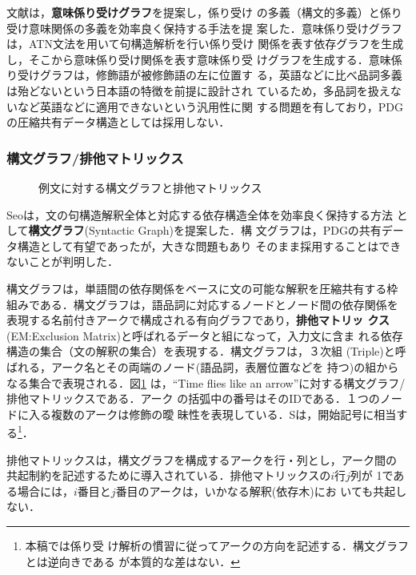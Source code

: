 文献\cite{Hirakawa02_j}は，{\bf 意味係り受けグラフ}を提案し，係り受け
の多義（構文的多義）と係り受け意味関係の多義を効率良く保持する手法を提
案した．意味係り受けグラフは，ATN文法を用いて句構造解析を行い係り受け
関係を表す依存グラフを生成し，そこから意味係り受け関係を表す意味係り受
けグラフを生成する．意味係り受けグラフは，修飾語が被修飾語の左に位置す
る，英語などに比べ品詞多義は殆どないという日本語の特徴を前提に設計され
ているため，多品詞を扱えないなど英語などに適用できないという汎用性に関
する問題を有しており，PDGの圧縮共有データ構造としては採用しない．

\subsubsection{構文グラフ/排他マトリックス}
\begin{figure}[b]
 \begin{center}
 \end{center}
\myfiglabelskip
\caption{例文に対する構文グラフと排他マトリックス}
\label{fig:KoubunGraph}
\end{figure}

Seoは，文の句構造解釈全体と対応する依存構造全体を効率良く保持する方法
として{\bf 構文グラフ}(Syntactic Graph)を提案した\cite{Seo89,Rim90}．構
文グラフは，PDGの共有データ構造として有望であったが，大きな問題もあり
そのまま採用することはできないことが判明した．

構文グラフは，単語間の依存関係をベースに文の可能な解釈を圧縮共有する枠
組みである．構文グラフは，語品詞に対応するノードとノード間の依存関係を
表現する名前付きアークで構成される有向グラフであり，{\bf 排他マトリッ
クス} (EM:Exclusion Matrix)と呼ばれるデータと組になって，入力文に含ま
れる依存構造の集合（文の解釈の集合）を表現する．構文グラフは，３次組
(Triple)と呼ばれる，アーク名とその両端のノード(語品詞，表層位置などを
持つ)の組からなる集合で表現される．図\ref{fig:KoubunGraph} は，``Time
flies like an arrow''に対する構文グラフ/排他マトリックスである．アーク
の括弧中の番号はそのIDである．１つのノードに入る複数のアークは修飾の曖
昧性を表現している．Sは，開始記号に相当する\footnote{本稿では係り受
け解析の慣習に従ってアークの方向を記述する．構文グラフとは逆向きである
が本質的な差はない．}．

排他マトリックスは，構文グラフを構成するアークを行・列とし，アーク間の
共起制約を記述するために導入されている．排他マトリックスの$i$行$j$列が
1である場合には，$i$番目と$j$番目のアークは，いかなる解釈(依存木)にお
いても共起しない．

